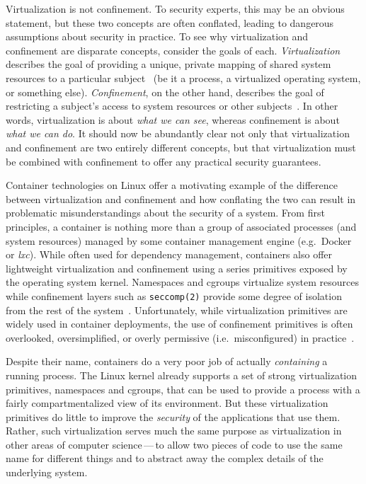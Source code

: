 Virtualization is not confinement. To security experts, this may be an obvious statement,
but these two concepts are often conflated, leading to dangerous assumptions about
security in practice. To see why virtualization and confinement are disparate concepts,
consider the goals of each. \textit{Virtualization} describes the goal of providing
a unique, private mapping of shared system resources to a particular subject~
(be it a process, a virtualized operating system, or something else).
\textit{Confinement}, on the other hand, describes the goal of restricting a subject's
access to system resources or other subjects~. In other words, virtualization
is about \textit{what we can see}, whereas confinement is about \textit{what we can do}.
It should now be abundantly clear not only that virtualization and confinement are two
entirely different concepts, but that virtualization must be combined with confinement to
offer any practical security guarantees.

Container technologies on Linux offer a motivating example of the difference between
virtualization and confinement and how conflating the two can result in problematic
misunderstandings about the security of a system. From first principles, a container is
nothing more than a group of associated processes (and system resources) managed by some
container management engine (e.g.~Docker or \textit{lxc}). While often used for dependency
management, containers also offer lightweight virtualization and confinement using
a series primitives exposed by the operating system kernel. Namespaces and cgroups
virtualize system resources while confinement layers such as \texttt{seccomp(2)} provide
some degree of isolation from the rest of the system~. Unfortunately, while
virtualization primitives are widely used in container deployments, the use of confinement
primitives is often overlooked, oversimplified, or overly permissive (i.e.~misconfigured)
in practice~.

Despite their name, containers do a very poor job of actually \textit{containing}
a running process.  The Linux kernel already supports a set of strong virtualization
primitives, namespaces and cgroups, that can be used to provide a process with a fairly
compartmentalized view of its environment. But these virtualization primitives do little
to improve the \textit{security} of the applications that use them. Rather, such
virtualization serves much the same purpose as virtualization in other areas of computer
science\,---\,to allow two pieces of code to use the same name for different things and to
abstract away the complex details of the underlying system.


